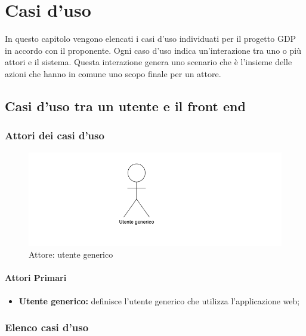 \chapter{Casi d'uso}\label{casiDuso}
In questo capitolo vengono elencati i casi d'uso individuati per il progetto GDP in accordo con il proponente. Ogni caso d'uso indica un'interazione tra uno o più attori e il sistema. Questa interazione genera uno scenario che è l'insieme delle azioni che hanno in comune uno scopo finale per un attore.

\section{Casi d'uso tra un utente e il front end}
\subsection{Attori dei casi d'uso}
\begin{center}
	\begin{figure}[H]
		\includegraphics{../immagini/attori_casi/utente_generico.png}
		\caption{Attore: utente generico}
	\end{figure}
\end{center}
\subsubsection{Attori Primari}\label{UFattoriPrimari}
\begin{itemize}
	\item \textbf{Utente generico:} definisce l'utente generico che utilizza l'applicazione web;
\end{itemize}

\subsection{Elenco casi d'uso}\label{UFelencoCasiDuso}

